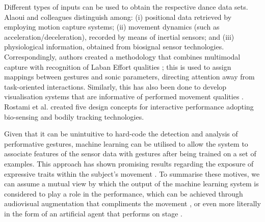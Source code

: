 Different types of inputs can be used to obtain the respective dance data sets. Alaoui and colleagues \cite{fdili_alaoui_seeing_2017} distinguish among: (i) positional data retrieved by employing motion capture systems; (ii) movement dynamics (such as acceleration/deceleration), recorded by means of inertial sensors; and (iii) physiological information, obtained from biosignal sensor technologies. Correspondingly, authors created a methodology that combines multimodal capture with recognition of Laban Effort qualities \cite{fdili_alaoui_seeing_2017}; this is used to assign mappings between gestures and sonic parameters, directing attention away from task-oriented interactions. Similarly, this has also been done to develop visualisation systems that are informative of performed movement qualities \cite{alaoui_interactive_2015,hussain_evaluating_2019,jego_workflow_2019}. Rostami et al. \cite{rostami_bio-sensed_2017} created five design concepts for interactive performance adopting bio-sensing and bodily tracking technologies.

Given that it can be unintuitive to hard-code the detection and analysis of performative gestures, machine learning can be utilised to allow the system to associate features of the sensor data with gestures after being trained on a set of examples. This approach has shown promising results regarding the exposure of expressive traits within the subject's movement \cite{caramiaux_understanding_2015}.
To summarise these motives, we can assume a mutual view by which the output of the machine learning system is considered to play a role in the performance, which can be achieved through audiovisual augmentation that compliments the movement \cite{francoise_coda_2022}, or even more literally in the form of an artificial agent that performs on stage \cite{liapis_learning_2018}.

